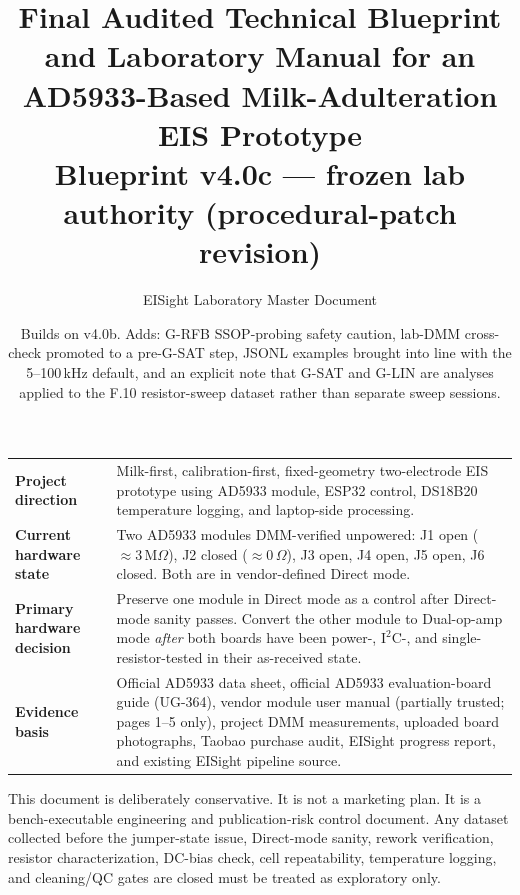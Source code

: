 \documentclass[11pt,a4paper]{article}
\title{\textbf{\color{EISNavy}Final Audited Technical Blueprint and Laboratory Manual for an AD5933-Based Milk-Adulteration EIS Prototype} \\[4pt] \large Blueprint v4.0c --- frozen lab authority (procedural-patch revision)}
\author{EISight Laboratory Master Document}
\date{Builds on v4.0b. Adds: G-RFB SSOP-probing safety caution, lab-DMM cross-check promoted to a pre-G-SAT step, JSONL examples brought into line with the 5--100\,kHz default, and an explicit note that G-SAT and G-LIN are analyses applied to the F.10 resistor-sweep dataset rather than separate sweep sessions.}
\newcommand{\Mohm}[1]{\ensuremath{#1\,\mathrm{M}\Omega}}
\newcommand{\Rohm}[1]{\ensuremath{#1\,\Omega}}
\begin{document}
\maketitle
\begin{center}
\begin{tabularx}{0.94\textwidth}{
>{\raggedright\arraybackslash}p{35mm}
>{\raggedright\arraybackslash}X
}
\toprule
\textbf{Project direction} &
Milk-first, calibration-first, fixed-geometry two-electrode EIS prototype using AD5933 module, ESP32 control, DS18B20 temperature logging, and laptop-side processing.\\

\textbf{Current hardware state} &
Two AD5933 modules DMM-verified unpowered: J1 open ($\approx\Mohm{3}$), J2 closed ($\approx\Rohm{0}$), J3 open, J4 open, J5 open, J6 closed. Both are in vendor-defined Direct mode.\\

\textbf{Primary hardware decision} &
Preserve one module in Direct mode as a control after Direct-mode sanity passes. Convert the other module to Dual-op-amp mode \emph{after} both boards have been power-, $\mathrm{I^2C}$-, and single-resistor-tested in their as-received state.\\

\textbf{Evidence basis} &
Official AD5933 data sheet, official AD5933 evaluation-board guide (UG-364), vendor module user manual (partially trusted; pages 1--5 only), project DMM measurements, uploaded board photographs, Taobao purchase audit, EISight progress report, and existing EISight pipeline source.\\
\bottomrule
\end{tabularx}
\end{center}
\vspace{2mm}

\begin{rulebox}
This document is deliberately conservative. It is not a marketing plan. It is a bench-executable engineering and publication-risk control document. Any dataset collected before the jumper-state issue, Direct-mode sanity, rework verification, resistor characterization, DC-bias check, cell repeatability, temperature logging, and cleaning/QC gates are closed must be treated as exploratory only.
\end{rulebox}

\vspace{2mm}
\end{document}
